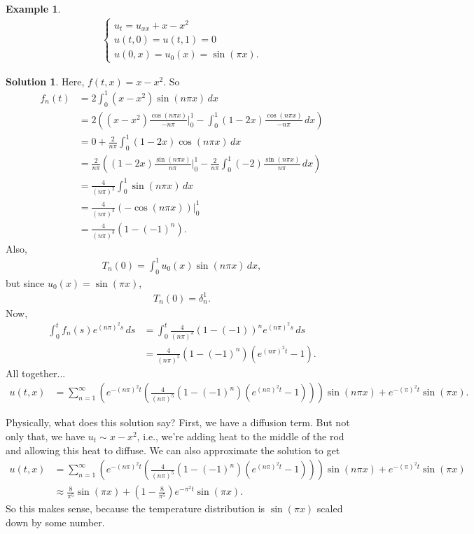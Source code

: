 \documentclass{article}
\theoremstyle{definition}
\newtheorem{exmp}{Example}[section]
\newtheorem*{sln*}{Solution}
\begin{document}
\begin{exmp}
	\begin{align*}
	\begin{cases}
	u_t = u_{xx} + x - x^2\\
	u(t,0) = u(t,1) = 0\\
	u(0,x) = u_0(x) = \sin(\pi x).
	\end{cases}
	\end{align*}
	\begin{sln*}
		Here, $f(t,x) = x - x^2$. So
		\begin{align*}
		f_n(t) &= 2\int^1_0 (x-x^2)\sin(n\pi x)\,dx\\
		&= 2\left( (x-x^2)\frac{\cos(n\pi x)}{-n\pi}\bigg\vert^1_0 - \int^1_0(1-2x)\frac{\cos(n\pi x)}{-n\pi}\,dx \right)\\
		&= 0 + \frac{2}{n\pi}\int^1_0 (1-2x)\cos(n\pi x)\,dx\\
		&= \frac{2}{n\pi}\left( (1-2x)\frac{\sin(n\pi x)}{n\pi}\bigg\vert^1_0 - \frac{2}{n\pi}\int^1_0(-2)\frac{\sin(n\pi x)}{n\pi}\,dx \right)\\
		&= \frac{4}{(n\pi)^2}\int^1_0 \sin(n\pi x)\,dx\\
		&= \frac{4}{(n\pi)^3}(-\cos(n\pi x))\bigg\vert^1_0\\
		&= \frac{4}{(n\pi)^3}(1-(-1)^n).
		\end{align*}
		Also,
		\begin{align*}
		T_n(0) = \int^1_0u_0(x)\sin(n\pi x)\,dx,
		\end{align*}
		but since $u_0(x) = \sin(\pi x)$,
		\begin{align*}
		T_n(0) = \delta^1_n.
		\end{align*}
		Now,
		\begin{align*}
		\int_0^t f_n(s) e^{( n \pi)^2s} \,ds &= \int_0^t \frac{4}{(n\pi)^3}(1-(-1))^n e^{( n \pi)^2s} \,ds\\
		&= \frac{4}{(n\pi)^5}(1-(-1)^n)\left(e^{(n\pi)^2t} - 1\right).
		\end{align*}
		All together...
		\begin{align*}
		u(t,x) &= \sum^\infty_{n=1} \left(e^{-( n\pi)^2t}\left(\frac{4}{(n\pi)^5}(1-(-1)^n)\left(e^{(n\pi)^2t} - 1\right) \right)\right)\sin(n\pi x) + e^{-(\pi )^2t}\sin(\pi x).
		\end{align*}
	\end{sln*}
\end{exmp}

Physically, what does this solution say? First, we have a diffusion term. But not only that, we have $u_t \sim x-x^2$, i.e., we're adding heat to the middle of the rod and allowing this heat to diffuse. We can also approximate the solution to get
\begin{align*}
u(t,x) &= \sum^\infty_{n=1} \left(e^{-( n\pi)^2t}\left(\frac{4}{(n\pi)^5}(1-(-1)^n)\left(e^{(n\pi)^2t} - 1\right) \right)\right)\sin(n\pi x) + e^{-(\pi )^2t}\sin(\pi x)\\
&\approx \frac{8}{\pi^5}\sin(\pi x) + \left(1 - \frac{8}{\pi^5}\right)e^{-\pi^2 t}\sin(\pi x).
\end{align*}
So this makes sense, because the temperature distribution is $\sin(\pi x)$ scaled down by some number. 
\end{document}
